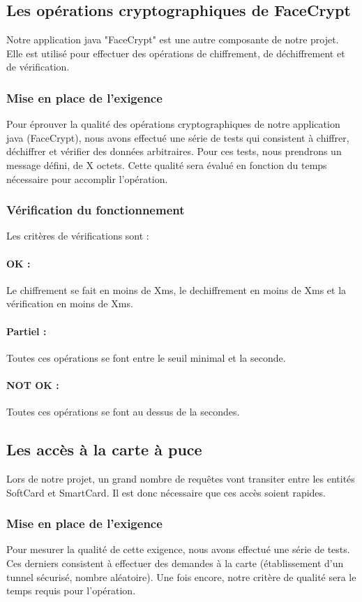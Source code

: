 \documentclass[a4paper,11pt,french]{article}
\begin{document}
\subsection{Les opérations cryptographiques de FaceCrypt}
	Notre application java "FaceCrypt" est une autre composante de notre
projet. Elle est utilisé pour effectuer des opérations de chiffrement, de
déchiffrement et de vérification.
\subsubsection{Mise en place de l'exigence}
	Pour éprouver la qualité des opérations cryptographiques de notre
application java (FaceCrypt), nous avons effectué une série de tests qui
consistent à chiffrer, déchiffrer et vérifier des données arbitraires. Pour
ces tests, nous prendrons un message défini, de X octets. Cette qualité sera
évalué en fonction du temps nécessaire pour accomplir l'opération.

\subsubsection{Vérification du fonctionnement}
	Les critères de vérifications sont :
\paragraph{OK : } Le chiffrement se fait en moins de Xms, le dechiffrement
en moins de Xms et la vérification en moins de Xms.
\paragraph{Partiel : } Toutes ces opérations se font entre le seuil minimal
et la seconde.
\paragraph{NOT OK : } Toutes ces opérations se font au dessus de la secondes.



\subsection{Les accès à la carte à puce}
	Lors de notre projet, un grand nombre de requêtes vont transiter
entre les entités SoftCard et SmartCard. Il est donc nécessaire que ces
accès soient rapides.
\subsubsection{Mise en place de l'exigence}
	Pour mesurer la qualité de cette exigence, nous avons effectué une
série de tests. Ces derniers consistent à effectuer des demandes à la carte
(établissement d'un tunnel sécurisé, nombre aléatoire). Une fois encore,
notre critère de qualité sera le temps requis pour l'opération.
\end{document}
